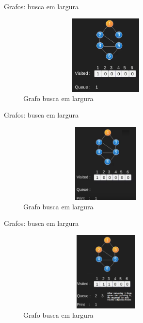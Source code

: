 \begin{frame}
	\begin{block}{Grafos: busca em largura}
		\begin{figure}[!htb]
			\centering	  
			\includegraphics[height=4cm, width = 9cm]{./pic/bfs2.png}
			\caption{Grafo busca em largura}
		\end{figure}
	\end{block}
\end{frame}

\begin{frame}
	\begin{block}{Grafos: busca em largura}
		\begin{figure}[!htb]
			\centering	  
			\includegraphics[height=4cm, width = 9cm]{./pic/bfs3.png}
			\caption{Grafo busca em largura}
		\end{figure}
	\end{block}
\end{frame}

\begin{frame}
	\begin{block}{Grafos: busca em largura}
		\begin{figure}[!htb]
			\centering	  
			\includegraphics[height=4cm, width = 9cm]{./pic/bfs4.png}
			\caption{Grafo busca em largura}
		\end{figure}
	\end{block}
\end{frame}

